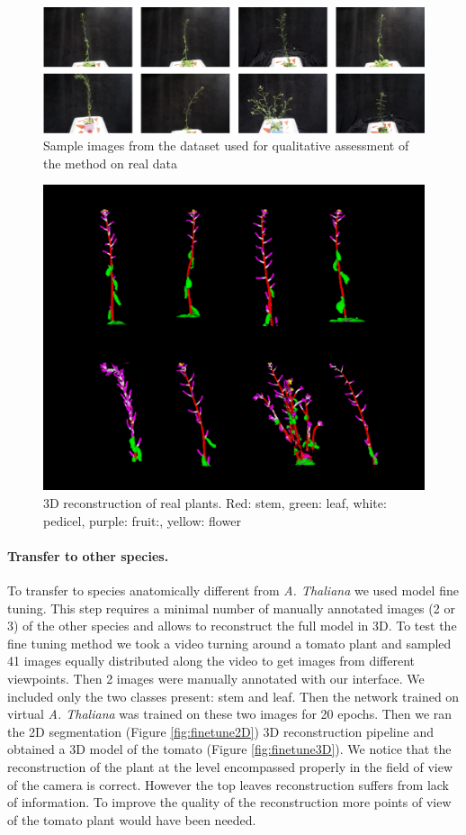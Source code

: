 \begin{figure}[h!]
    \centering \includegraphics[width = \linewidth]{figures/seg-crop.pdf}
    \caption{Sample images from the dataset used for qualitative assessment of the method on real data} \label{fig:realscans}
\end{figure}

\begin{figure}[h!]
    \centering \includegraphics[width = 0.7\linewidth]{figures/capture.png}
    \caption{3D reconstruction of real plants. Red: stem, green: leaf, white: pedicel, purple: fruit:, yellow: flower} \label{fig:rec3d}
\end{figure}

\paragraph{Transfer to other species.}
To transfer to species anatomically different from \emph{A. Thaliana} we used model fine tuning. This step requires a minimal number of manually annotated images (2 or 3) of the other species and allows to reconstruct the full model in 3D. To test the fine tuning method we took a video turning around a tomato plant and sampled 41 images equally distributed along the video to get images from different viewpoints. Then 2 images were manually annotated with our interface. We included only the two classes present: stem and leaf. Then the network trained on virtual \emph{A. Thaliana} was trained on these two images for 20 epochs. Then we ran the 2D segmentation (Figure \ref{fig:finetune2D}) 3D reconstruction pipeline and obtained a 3D model of the tomato (Figure \ref{fig:finetune3D}). We notice that the reconstruction of the plant at the level encompassed properly in the field of view of the camera is correct. However the top leaves reconstruction suffers from lack of information. To improve the quality of the reconstruction more points of view of the tomato plant would have been needed. 

